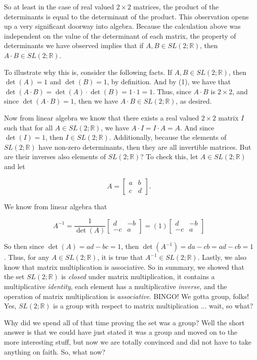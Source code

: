 \documentclass{article}
\theoremstyle{definition}
\theoremstyle{remark}
\begin{document}
So at least in the case of real valued $2\times 2$ matrices, the product of the determinants is equal to the determinant of the product. This observation opens up a very significant doorway into algebra. Because the calculation above was independent on the value of the determinant of each matrix, the property of determinants we have observed implies that if $A,B\in SL(2;\mathbb{R})$, then $A\cdot B\in SL(2;\mathbb{R})$.\par
To illustrate why this is, consider the following facts. If $A,B\in SL(2;\mathbb{R})$, then $\det(A)=1$ and $\det(B)=1$, by definition. And by (1), we have that $\det(A\cdot B)=\det(A)\cdot\det(B)=1\cdot 1=1$. Thus, since $A\cdot B$ is $2\times 2$, and since $\det(A\cdot B)=1$, then we have $A\cdot B\in SL(2;\mathbb{R})$, as desired.\par 
Now from linear algebra we know that there exists a real valued $2\times 2$ matrix $I$ such that for all  $A\in SL(2;\mathbb{R})$, we have $A\cdot I=I\cdot A= A$. And since $\det(I)=1$, then $I\in SL(2;\mathbb{R})$. Additionally, because the elements of $SL(2;\mathbb{R})$ have non-zero determinants, then they are all invertible matrices. But are their inverses also elements of $SL(2;\mathbb{R})$? To check this, let $A\in SL(2;\mathbb{R})$ and let

\begin{equation*}
    A=\begin{bmatrix} a & b\\c & d\end{bmatrix}.
\end{equation*}

\noindent We know from linear algebra that

\begin{equation*}
    A^{-1}=\frac{1}{\det(A)}\begin{bmatrix} d & -b\\-c & a\end{bmatrix}=(1)\begin{bmatrix} d & -b\\-c & a\end{bmatrix}
\end{equation*}

\noindent So then since $\det(A)=ad-bc=1$, then $\det(A^{-1})=da-cb=ad-cb=1$. Thus, for any $A\in SL(2;\mathbb{R})$, it is true that $A^{-1}\in SL(2;\mathbb{R})$. Lastly, we also know that matrix multiplication is associative. So in summary, we showed that the set $SL(2;\mathbb{R})$ is \textit{closed} under matrix multiplication, it contains a multiplicative \textit{identity}, each element has a multiplicative \textit{inverse}, and the operation of matrix multiplication is \textit{associative}. BINGO! We gotta group, folks! Yes, $SL(2;\mathbb{R})$ is a group with respect to matrix multiplication ... wait, so what?\par 
Why did we spend all of that time proving the set was a group? Well the short answer is that we could have just stated it was a group and moved on to the more interesting stuff, but now we are totally convinced and did not have to take anything on faith. So, what now?
\end{document}
